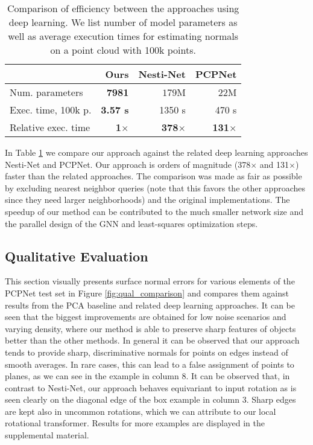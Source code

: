 \documentclass[10pt,twocolumn,letterpaper]{article}
\begin{document}
\begin{table}[h]
\small
  \centering
\begin{tabular}{lrrr}
      \toprule
 & Ours    & Nesti-Net \cite{Ben-Shabat:2018} &  PCPNet \cite{Guerrero:2018}  \\ \midrule
Num. parameters     & \textbf{7981} & $179$M &   $22$M \\ 
Exec. time, 100k p.  & \textbf{3.57 s}  & 1350 s  & 470 s  \\ 
Relative exec. time  & \textbf{1$\times$} &  \textbf{378$\times$}  & \textbf{131$\times$} \\ 
\bottomrule
\end{tabular}
\caption{Comparison of efficiency between the approaches using deep learning. We list number of model parameters as well as average execution times for estimating normals on a point cloud with 100k points.}
\label{tab:complexity}
\end{table}
\vspace{-3mm}

In Table \ref{tab:complexity} we compare our approach against the related deep learning approaches Nesti-Net and PCPNet. Our approach is orders of magnitude (378$\times$ and 131$\times$) faster than the related approaches. The comparison was made as fair as possible by excluding nearest neighbor queries (note that this favors the other approaches since they need larger neighborhoods) and the original implementations.
The speedup of our method can be contributed to the much smaller network size and the parallel design of the GNN and least-squares optimization steps.











\subsection{Qualitative Evaluation}
\label{sec:qualitative}
This section visually presents surface normal errors for various elements of the PCPNet test set in Figure \ref{fig:qual_comparison} and compares them against results from the PCA baseline and related deep learning approaches. It can be seen that the biggest improvements are obtained for low noise scenarios and varying density, where our method is able to preserve sharp features of objects better than the other methods. In general it can be observed that our approach tends to provide sharp, discriminative normals for points on edges instead of smooth averages. In rare cases, this can lead to a false assignment of points to planes, as we can see in the example in column 8. It can be observed  that, in contrast to Nesti-Net, our approach behaves equivariant to input rotation as is seen clearly on the diagonal edge of the box example in column 3. Sharp edges are kept also in uncommon rotations, which we can attribute to our local rotational transformer. Results for more examples are displayed in the supplemental material.
\end{document}
